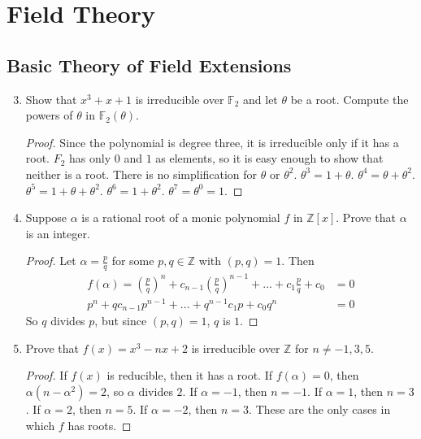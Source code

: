\documentclass{report}
\newcommand{\Z}{\mathbb{Z}}
\newcommand{\F}{\mathbb{F}}
\begin{document}
\chapter{Field Theory}
\section{Basic Theory of Field Extensions}
\begin{enumerate} 
	\setcounter{enumi}{2}
	\item  Show that $x^3+x+1$ is irreducible over $\F_2$ and let $\theta$ be a root. Compute the powers of $\theta$ in $\F_2(\theta)$.
		\begin{proof}
			Since the polynomial is degree three, it is irreducible only if it has a root. $F_2$ has only $0$ and $1$ as elements, so it is easy enough to show that neither is a root.
			There is no simplification for $\theta$ or $\theta^2$. $\theta^3=1+\theta$. $\theta^4=\theta+\theta^2$. $\theta^5=1+\theta+\theta^2$. $\theta^6=1+\theta^2$. $\theta^7=\theta^0=1$.
		\end{proof}
	\setcounter{enumi}{4}
	\item Suppose $\alpha$ is a rational root of a monic polynomial $f$ in $\Z[x]$. Prove that $\alpha$ is an integer.
		\begin{proof}
			Let $\alpha=\frac{p}{q}$ for some  $p,q\in\Z$ with $(p,q)=1$. Then
			\begin{align*}
				f(\alpha)=\left(\frac{p}{q}\right)^n+c_{n-1}\left(\frac{p}{q}\right)^{n-1}+...+c_1 \frac{p}{q}+c_0&=0\\
				p^n+qc_{n-1}p^{n-1}+...+q^{n-1}c_1p+c_0q^n&=0
			\end{align*}
			So $q$ divides $p$, but since $(p,q)=1$, $q$ is $1$.
		\end{proof}
	\setcounter{enumi}{6}
	\item Prove that $f(x)=x^3-nx+2$ is irreducible over $\Z$ for $n\neq -1,3,5$.
		\begin{proof}
			If $f(x)$ is reducible, then it has a root. If $f(\alpha)=0$, then $\alpha(n-\alpha^2)=2$, so $\alpha$ divides $2$.
			If $\alpha=-1$, then $n=-1$. If $\alpha=1$, then $n=3$. If $\alpha=2$, then $n=5$. If $\alpha=-2$, then $n=3$.
			These are the only cases in which $f$ has roots.
		\end{proof}
\end{enumerate}
\end{document}
